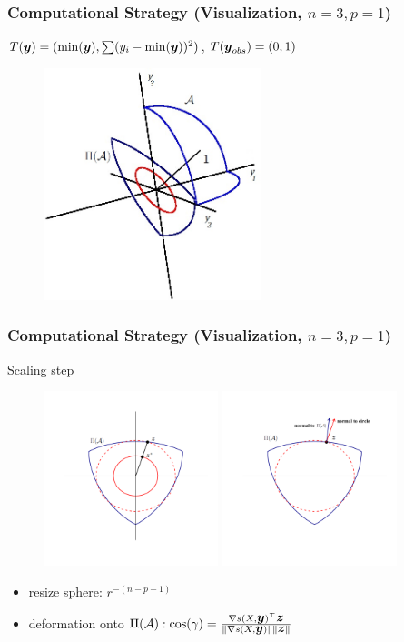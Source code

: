 \documentclass{beamer}
\newcommand{\by}{\mbox{\boldmath $y$}}
\newcommand{\bz}{\mbox{\boldmath $z$}}
\begin{document}
\begin{frame}
	\frametitle{Computational Strategy (Visualization, $n=3, p=1$)}
$T(\by)=(\min(\by),\sum (y_i - \min(\by))^2)$, $T(\by_{obs})=(0,1)$
\begin{figure}[t]
	\centering
	\includegraphics[width=2.5in]{minSS3dSampleSpace.jpg}
	\label{fig:sampSpace}
\end{figure}
	
\end{frame}


\begin{frame}
	\frametitle{Computational Strategy (Visualization, $n=3, p=1$)}
Scaling step
\begin{figure}[t]
		\centering
		{\includegraphics[width=2in]{minSSZSpace3.pdf}}
		{\includegraphics[width=2in]{minSSZSpace5.pdf}}
		\label{fig:stretchDeform}
\end{figure}
\begin{itemize}
	\item resize sphere: $r^{-(n-p-1)}$
	\item deformation onto $\Pi(\mathcal{A}): \cos(\gamma)=\frac{\nabla s(X,\by)^\top \bz}{\|\nabla
		s(X,\by)\| \|\bz\|}$
\end{itemize}

\end{frame}
\end{document}
